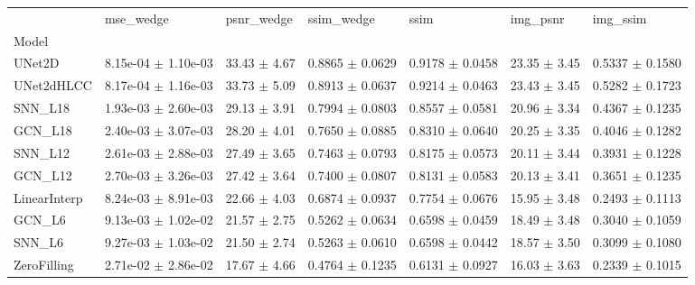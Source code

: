 \begin{tabular}{lllllll}
\toprule
 & mse\_wedge & psnr\_wedge & ssim\_wedge & ssim & img\_psnr & img\_ssim \\
Model &  &  &  &  &  &  \\
\midrule
UNet2D & 8.15e-04 $\pm$ 1.10e-03 & 33.43 $\pm$ 4.67 & 0.8865 $\pm$ 0.0629 & 0.9178 $\pm$ 0.0458 & 23.35 $\pm$ 3.45 & 0.5337 $\pm$ 0.1580 \\
UNet2dHLCC & 8.17e-04 $\pm$ 1.16e-03 & 33.73 $\pm$ 5.09 & 0.8913 $\pm$ 0.0637 & 0.9214 $\pm$ 0.0463 & 23.43 $\pm$ 3.45 & 0.5282 $\pm$ 0.1723 \\
SNN\_L18 & 1.93e-03 $\pm$ 2.60e-03 & 29.13 $\pm$ 3.91 & 0.7994 $\pm$ 0.0803 & 0.8557 $\pm$ 0.0581 & 20.96 $\pm$ 3.34 & 0.4367 $\pm$ 0.1235 \\
GCN\_L18 & 2.40e-03 $\pm$ 3.07e-03 & 28.20 $\pm$ 4.01 & 0.7650 $\pm$ 0.0885 & 0.8310 $\pm$ 0.0640 & 20.25 $\pm$ 3.35 & 0.4046 $\pm$ 0.1282 \\
SNN\_L12 & 2.61e-03 $\pm$ 2.88e-03 & 27.49 $\pm$ 3.65 & 0.7463 $\pm$ 0.0793 & 0.8175 $\pm$ 0.0573 & 20.11 $\pm$ 3.44 & 0.3931 $\pm$ 0.1228 \\
GCN\_L12 & 2.70e-03 $\pm$ 3.26e-03 & 27.42 $\pm$ 3.64 & 0.7400 $\pm$ 0.0807 & 0.8131 $\pm$ 0.0583 & 20.13 $\pm$ 3.41 & 0.3651 $\pm$ 0.1235 \\
LinearInterp & 8.24e-03 $\pm$ 8.91e-03 & 22.66 $\pm$ 4.03 & 0.6874 $\pm$ 0.0937 & 0.7754 $\pm$ 0.0676 & 15.95 $\pm$ 3.48 & 0.2493 $\pm$ 0.1113 \\
GCN\_L6 & 9.13e-03 $\pm$ 1.02e-02 & 21.57 $\pm$ 2.75 & 0.5262 $\pm$ 0.0634 & 0.6598 $\pm$ 0.0459 & 18.49 $\pm$ 3.48 & 0.3040 $\pm$ 0.1059 \\
SNN\_L6 & 9.27e-03 $\pm$ 1.03e-02 & 21.50 $\pm$ 2.74 & 0.5263 $\pm$ 0.0610 & 0.6598 $\pm$ 0.0442 & 18.57 $\pm$ 3.50 & 0.3099 $\pm$ 0.1080 \\
ZeroFilling & 2.71e-02 $\pm$ 2.86e-02 & 17.67 $\pm$ 4.66 & 0.4764 $\pm$ 0.1235 & 0.6131 $\pm$ 0.0927 & 16.03 $\pm$ 3.63 & 0.2339 $\pm$ 0.1015 \\
\bottomrule
\end{tabular}
